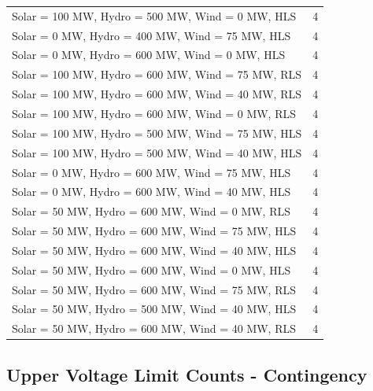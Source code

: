 \documentclass[10pt]{report}
\begin{document}
\begin{table}[H]
{\begin{tabular}{lr}
Solar = 100 MW, Hydro = 500 MW, Wind = 0 MW, HLS & 4 \\
Solar = 0 MW, Hydro = 400 MW, Wind = 75 MW, HLS & 4 \\
Solar = 0 MW, Hydro = 600 MW, Wind = 0 MW, HLS & 4 \\
Solar = 100 MW, Hydro = 600 MW, Wind = 75 MW, RLS & 4 \\
Solar = 100 MW, Hydro = 600 MW, Wind = 40 MW, RLS & 4 \\
Solar = 100 MW, Hydro = 600 MW, Wind = 0 MW, RLS & 4 \\
Solar = 100 MW, Hydro = 500 MW, Wind = 75 MW, HLS & 4 \\
Solar = 100 MW, Hydro = 500 MW, Wind = 40 MW, HLS & 4 \\
Solar = 0 MW, Hydro = 600 MW, Wind = 75 MW, HLS & 4 \\
Solar = 0 MW, Hydro = 600 MW, Wind = 40 MW, HLS & 4 \\
Solar = 50 MW, Hydro = 600 MW, Wind = 0 MW, RLS & 4 \\
Solar = 50 MW, Hydro = 600 MW, Wind = 75 MW, HLS & 4 \\
Solar = 50 MW, Hydro = 600 MW, Wind = 40 MW, HLS & 4 \\
Solar = 50 MW, Hydro = 600 MW, Wind = 0 MW, HLS & 4 \\
Solar = 50 MW, Hydro = 600 MW, Wind = 75 MW, RLS & 4 \\
Solar = 50 MW, Hydro = 500 MW, Wind = 40 MW, HLS & 4 \\
Solar = 50 MW, Hydro = 600 MW, Wind = 40 MW, RLS & 4 \\
\bottomrule
\end{tabular}}
\end{table}



\subsection{Upper Voltage Limit Counts - Contingency}

\begin{table}[H]
\caption{Upper Voltage Limit Counts - Contingency}
\label{count_high_cont}
\centering
{}
\end{table}
\end{document}
